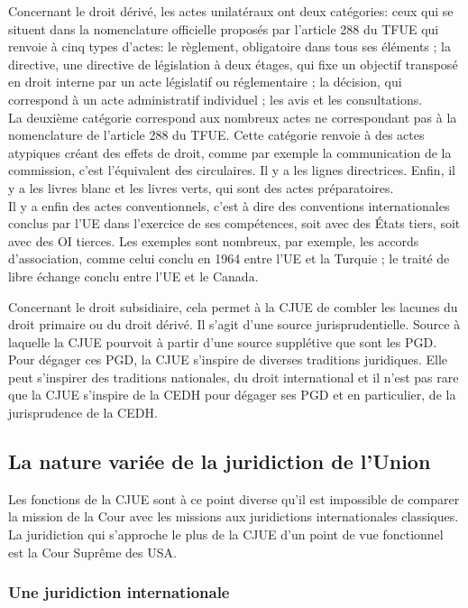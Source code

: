 \documentclass[10pt, a4paper, openany]{book}
\begin{document}
Concernant le droit dérivé, les actes unilatéraux ont deux catégories: ceux qui se situent dans la nomenclature officielle proposés par l'article 288 du TFUE qui renvoie à cinq types d'actes: le règlement, obligatoire dans tous ses éléments ; la directive, une directive de législation à deux étages, qui fixe un objectif transposé en droit interne par un acte législatif ou réglementaire ; la décision, qui correspond à un acte administratif individuel ; les avis et les consultations. \\
La deuxième catégorie correspond aux nombreux actes ne correspondant pas à la nomenclature de l'article 288 du TFUE. Cette catégorie renvoie à des actes atypiques créant des effets de droit, comme par exemple la communication de la commission, c'est l'équivalent des circulaires. Il y a les lignes directrices. Enfin, il y a les livres blanc et les livres verts, qui sont des actes préparatoires. \\
Il y a enfin des actes conventionnels, c'est à dire des conventions internationales conclus par l'UE dans l'exercice de ses compétences, soit avec des États tiers, soit avec des OI tierces. Les exemples sont nombreux, par exemple, les accords d'association, comme celui conclu en 1964 entre l'UE et la Turquie ; le traité de libre échange conclu entre l'UE et le Canada.


Concernant le droit subsidiaire, cela permet à la CJUE de combler les lacunes du droit primaire ou du droit dérivé. Il s'agit d'une source jurisprudentielle. Source à laquelle la CJUE pourvoit à partir d'une source supplétive que sont les PGD. Pour dégager ces PGD, la CJUE s'inspire de diverses traditions juridiques. Elle peut s'inspirer des traditions nationales, du droit international et il n'est pas rare que la CJUE s'inspire de la CEDH pour dégager ses PGD et en particulier, de la jurisprudence de la CEDH. 

\subsection{La nature variée de la juridiction de l'Union}

Les fonctions de la CJUE sont à ce point diverse qu'il est impossible de comparer la mission de la Cour avec les missions aux juridictions internationales classiques. La juridiction qui s'approche le plus de la CJUE d'un point de vue fonctionnel est la Cour Suprême des USA. 

\subsubsection{Une juridiction internationale}
\end{document}
